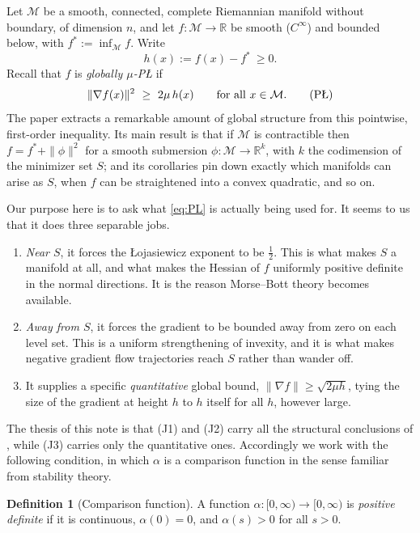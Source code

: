 \documentclass[11pt]{article}
\theoremstyle{plain}
\theoremstyle{definition}
\newtheorem{defn}[thm]{Definition}
\theoremstyle{remark}
\newcommand{\M}{\mathcal{M}}
\newcommand{\R}{\mathbb{R}}
\newcommand{\PL}{\textup{P\L}}
\begin{document}
Let $\M$ be a smooth, connected, complete Riemannian manifold without boundary,
of dimension $n$, and let $f\colon\M\to\R$ be smooth ($C^\infty$) and bounded
below, with $f^* := \inf_{\M} f$. Write
\[
  h(x) := f(x) - f^* \ \ge 0 .
\]
Recall that $f$ is \emph{globally $\mu$-P\L{}} if
\begin{equation}
  \|\nabla f(x)\|^2 \ \ge\ 2\mu\, h(x) \qquad \text{for all } x \in \M .
  \tag{\PL}\label{eq:PL}
\end{equation}
The paper \cite{BCR2026} extracts a remarkable amount of global structure from
this pointwise, first-order inequality. Its main result is that if $\M$ is
contractible then $f = f^* + \|\phi\|^2$ for a smooth submersion
$\phi\colon\M\to\R^k$, with $k$ the codimension of the minimizer set $S$; and
its corollaries pin down exactly which manifolds can arise as $S$, when $f$ can
be straightened into a convex quadratic, and so on.

Our purpose here is to ask what \eqref{eq:PL} is actually being used for. It
seems to us that it does three separable jobs.

\begin{enumerate}
\item[(J1)] \emph{Near $S$}, it forces the \L{}ojasiewicz exponent to be
$\tfrac12$. This is what makes $S$ a manifold at all, and what makes the Hessian
of $f$ uniformly positive definite in the normal directions. It is the reason
Morse--Bott theory becomes available.
\item[(J2)] \emph{Away from $S$}, it forces the gradient to be bounded away from
zero on each level set. This is a uniform strengthening of invexity, and it is
what makes negative gradient flow trajectories reach $S$ rather than wander off.
\item[(J3)] It supplies a specific \emph{quantitative} global bound,
$\|\nabla f\| \ge \sqrt{2\mu h}$, tying the size of the gradient at height $h$
to $h$ itself for all $h$, however large.
\end{enumerate}

The thesis of this note is that (J1) and (J2) carry all the structural
conclusions of \cite{BCR2026}, while (J3) carries only the quantitative ones.
Accordingly we work with the following condition, in which $\alpha$ is a
comparison function in the sense familiar from stability theory.

\begin{defn}[Comparison function]\label{def:alpha}
A function $\alpha\colon[0,\infty)\to[0,\infty)$ is \emph{positive definite} if
it is continuous, $\alpha(0)=0$, and $\alpha(s)>0$ for all $s>0$.
\end{defn}
\end{document}

